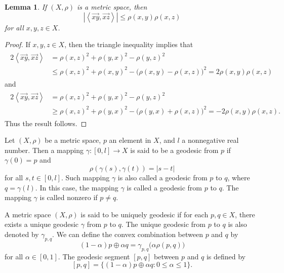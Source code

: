 \documentclass[draft]{amsart}
\numberwithin{equation}{section}
\newcommand{\ip}[2]{\left\langle #1, #2 \right\rangle}
\providecommand{\abs}[1]{\left\lvert#1\right\rvert}
\theoremstyle{plain}
\newtheorem{lemma}[theorem]{Lemma}
\theoremstyle{definition}
\theoremstyle{remark}
\begin{document}
\begin{lemma}
 If $(X, \rho)$ is a metric space, then 
 \[
  \abs{\ip{\overrightarrow{xy}}{\overrightarrow{xz}}} 
  \leq \rho(x,y)\rho(x,z)
 \]
 for all $x,y,z\in X$. 
\end{lemma}

\begin{proof}
 If $x,y,z\in X$, then the triangle inequality 
 implies that 
 \begin{align*}
  \begin{split}
  2\ip{\overrightarrow{xy}}{\overrightarrow{xz}} 
  &= \rho(x,z)^2 + \rho(y,x)^2 - \rho(y,z)^2 \\
  &\leq  \rho(x,z)^2 + \rho(x,y)^2 - \bigl(\rho(x,y)-\rho(x,z)\bigr)^2 = 2\rho(x,y)\rho(x,z)
  \end{split}
 \end{align*}
and 
 \begin{align*}
  \begin{split}
  2\ip{\overrightarrow{xy}}{\overrightarrow{xz}} 
  &= \rho(x,z)^2 + \rho(y,x)^2 - \rho(y,z)^2 \\
  &\geq  \rho(x,z)^2 + \rho(y,x)^2 - \bigl(\rho(y,x)+\rho(x,z)\bigr)^2 = -2\rho(x,y)\rho(x,z). 
  \end{split}
 \end{align*}
 Thus the result follows. 
\end{proof}

Let $(X, \rho)$ be a metric space, $p$ an element in $X$, 
and $l$ a nonnegative real number. 
Then a mapping $\gamma \colon [0,l]\to X$ is said to be 
a geodesic from $p$ if $\gamma(0)=p$ and 
\[
 \rho(\gamma(s), \gamma(t)) 
 = \abs{s-t}
\]
for all $s,t\in [0,l]$. 
Such mapping $\gamma$ is also called 
a geodesic from $p$ to $q$, where $q=\gamma (l)$. 
In this case, the mapping $\gamma$ 
is called a geodesic from $p$ to $q$. 
The mapping $\gamma$ is called nonzero if $p\neq q$. 

A metric space $(X, \rho)$ is said to be 
uniquely geodesic if for each $p,q\in X$, 
there exists a unique geodesic $\gamma$ from $p$ to $q$. 
The unique geodesic from $p$ to $q$ 
is also denoted by $\gamma_{p, q}$. 
We can define the convex combination between $p$ and $q$ by 
\[
 (1-\alpha) p \oplus \alpha q = \gamma_{p,q} \bigl(\alpha \rho(p, q)\bigr)
\]
for all $\alpha \in [0,1]$. 
The geodesic segment $[p, q]$ between $p$ and $q$ is defined by 
\[
 [p,q] = \bigl\{(1-\alpha) p \oplus \alpha q: 0\leq \alpha \leq 1\bigr\}. 
\] 
\end{document}
